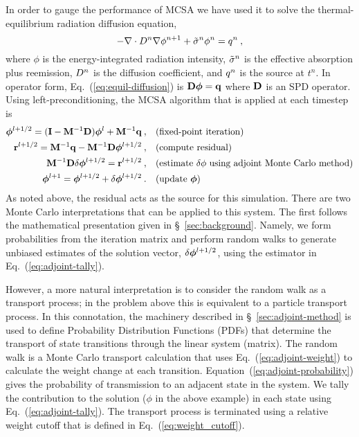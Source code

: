 In order to gauge the performance of MCSA we have used it to solve the
thermal-equilibrium radiation diffusion equation,
\begin{equation}
  -\nabla\cdot D^n\nabla \phi^{n+1} + \tilde{\sigma}^n\phi^{n} = q^n\:,
  \label{eq:equil-diffusion}
\end{equation}
where $\phi$ is the energy-integrated radiation intensity, $\tilde{\sigma}^n$ is the
effective absorption plus reemission, $D^n$ is the diffusion coefficient, and
$q^n$ is the source at $t^n$.  In operator form,
Eq.~(\ref{eq:equil-diffusion}) is $\mathbf{D}\boldsymbol{\phi} = \mathbf{q}$ where $\mathbf{D}$ is an
SPD operator.  Using left-preconditioning, the MCSA algorithm that is applied
at each timestep is
\begin{align*}
  \boldsymbol{\phi}^{l+1/2} = (\mathbf{I} - \mathbf{M}^{-1}\mathbf{D})\boldsymbol{\phi}^{l} +
  \mathbf{M}^{-1}\mathbf{q}\:, \quad & (\text{fixed-point iteration})\\
  \mathbf{r}^{l+1/2} = \mathbf{M}^{-1}\mathbf{q} - \mathbf{M}^{-1}\mathbf{D}\boldsymbol{\phi}^{l+1/2}\:,
  \quad & (\text{compute residual})\\
  \mathbf{M}^{-1}\mathbf{D}\delta\boldsymbol{\phi}^{l+1/2} = \mathbf{r}^{l+1/2}\:, \quad&
  (\text{estimate $\delta\phi$ using adjoint Monte Carlo method})\\
  \boldsymbol{\phi}^{l+1} = \boldsymbol{\phi}^{l+1/2} + \delta\boldsymbol{\phi}^{l+1/2}\:. \quad&
  (\text{update}\ \boldsymbol{\phi})
\end{align*}
As noted above, the residual acts as the source for this simulation.  There
are two Monte Carlo interpretations that can be applied to this system.  The
first follows the mathematical presentation given in \S~\ref{sec:background}.
Namely, we form probabilities from the iteration matrix and perform random
walks to generate unbiased estimates of the solution vector,
$\delta\boldsymbol{\phi}^{l+1/2}$, using the estimator in Eq.~(\ref{eq:adjoint-tally}).

However, a more natural interpretation is to consider the random walk as a
transport process; in the problem above this is equivalent to a particle
transport process.  In this connotation, the machinery described in
\S~\ref{sec:adjoint-method} is used to define Probability Distribution
Functions (PDFs) that determine the transport of state transitions through the
linear system (matrix). The random walk is a Monte Carlo transport calculation
that uses Eq.~(\ref{eq:adjoint-weight}) to calculate the weight change at each
transition. Equation~(\ref{eq:adjoint-probability}) gives the probability of
transmission to an adjacent state in the system. We tally the contribution to
the solution ($\phi$ in the above example) in each state using
Eq.~(\ref{eq:adjoint-tally}).  The transport process is terminated using a
relative weight cutoff that is defined in Eq.~(\ref{eq:weight_cutoff}).

